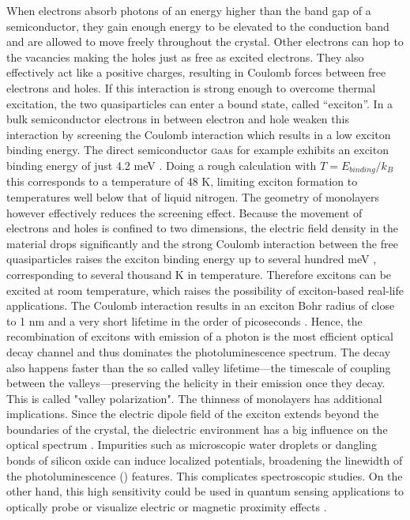 When electrons absorb photons of an energy higher than the band gap of a semiconductor, they gain enough energy to be elevated to the conduction band and are allowed to move freely throughout the crystal. Other electrons can hop to the vacancies making the holes just as free as excited electrons. They also effectively act like a positive charges, resulting in Coulomb forces between free electrons and holes. If this interaction is strong enough to overcome thermal excitation, the two quasiparticles can enter a bound state, called ``exciton''. In a bulk semiconductor electrons in between electron and hole weaken this interaction by screening the Coulomb interaction which results in a low exciton binding energy. The direct semiconductor \textsc{g}a\textsc{a}s for example exhibits an exciton binding energy of just 4.2 meV \cite{pelant_luminescence_2012}. Doing a rough calculation with $T=E_{binding}/k_B$ this corresponds to a temperature of 48 K, limiting exciton formation to temperatures well below that of liquid nitrogen.
The geometry of \tmdg monolayers however effectively reduces the screening effect. Because the movement of electrons and holes is confined to two dimensions, the electric field density in the material drops significantly and the strong Coulomb interaction between the free quasiparticles raises the exciton binding energy up to several hundred meV \cite{chernikov_exciton_2014, hanbicki_measurement_2015, he_tightly_2014}, corresponding to several thousand K in temperature. Therefore excitons can be excited at room temperature, which raises the possibility of exciton-based real-life applications. The Coulomb interaction results in an exciton Bohr radius of close to 1 nm and a very short lifetime in the order of picoseconds \cite{palummo_exciton_2015}. Hence, the recombination of excitons with emission of a photon is the most efficient optical decay channel and thus dominates the photoluminescence spectrum.
The decay also happens faster than the so called valley lifetime---the timescale of coupling between the valleys---preserving the helicity in their emission once they decay. This is called "valley polarization".
The thinness of \tmdg monolayers has additional implications. Since the electric dipole field of the exciton extends beyond the boundaries of the crystal, the dielectric environment has a big influence on the optical spectrum \cite{stier_probing_2016, borghardt_engineering_2017, jakubczyk_impact_2018}. Impurities such as microscopic water droplets or dangling bonds of silicon oxide can induce localized potentials, broadening the linewidth of the photoluminescence (\pl\!) features. This complicates spectroscopic studies. On the other hand, this high sensitivity could be used in quantum sensing applications to optically probe or visualize electric or magnetic proximity effects \cite{peng_valley_2017, zhao_enhanced_2017, smolenski_tuning_2016, neumann_opto-valleytronic_2017}.


